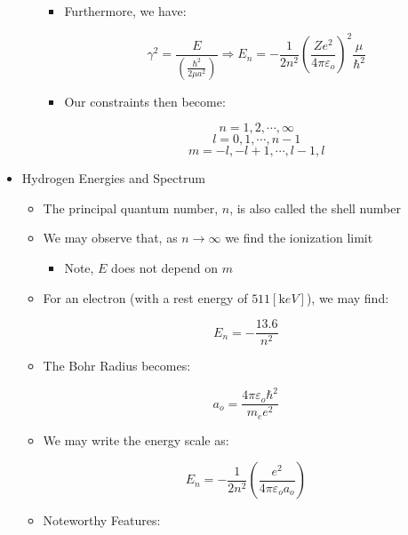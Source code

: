 \begin{itemize}
\begin{itemize}
\begin{itemize}
          \item Furthermore, we have:

            $$\gamma^2=\frac{E}{\left( \frac{\hbar^2}{2\mu a^2} \right)}\Rightarrow E_n=-\frac{1}{2n^2}\left( \frac{Ze^2}{4\pi\varepsilon_o} \right)^2\frac{\mu}{\hbar^2}$$

          \item Our constraints then become:

            $$n=1,2,\cdots,\infty$$
            $$l=0,1,\cdots,n-1$$
            $$m=-l,-l+1,\cdots,l-1,l$$

        \end{itemize}

    \end{itemize}

  \item Hydrogen Energies and Spectrum

    \begin{itemize}

      \item The principal quantum number, $n$, is also called the shell number

      \item We may observe that, as $n\to\infty$ we find the ionization limit

        \begin{itemize}

          \item Note, $E$ does not depend on $m$

        \end{itemize}

      \item For an electron (with a rest energy of $511[\si{\kilo eV}]$), we may find:

        $$E_n=-\frac{13.6}{n^2}$$

      \item The Bohr Radius becomes:

        $$a_o=\frac{4\pi\varepsilon_o\hbar^2}{m_ee^2}$$

      \item We may write the energy scale as:

        $$E_n=-\frac{1}{2n^2}\left( \frac{e^2}{4\pi\varepsilon_oa_o} \right)$$

      \item Noteworthy Features:

        \begin{itemize}


\end{itemize}
\end{itemize}
\end{itemize}
